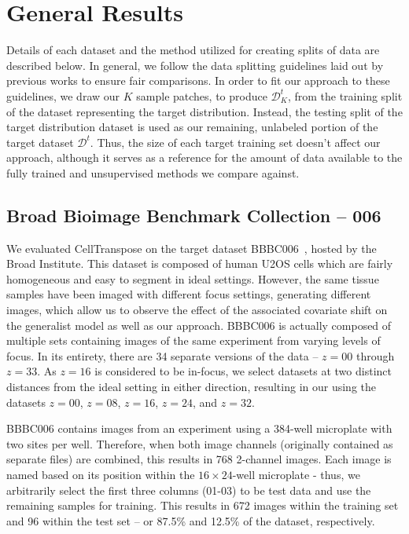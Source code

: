 
\section{General Results} \label{general_results}

Details of each dataset and the method utilized for creating splits of data are described below. In general, we follow the data splitting guidelines laid out by previous works to ensure fair comparisons. In order to fit our approach to these guidelines, we draw our $K$ sample patches, to produce $\mathcal{D}^t_K$, from the training split of the dataset representing the target distribution. Instead, the testing split of the target distribution dataset is used as our remaining, unlabeled portion of the target dataset $\mathcal{D}^t$. Thus, the size of each target training set doesn't affect our approach, although it serves as a reference for the amount of data available to the fully trained and unsupervised methods we compare against.

\subsection{Broad Bioimage Benchmark Collection -- 006}
We evaluated CellTranspose on the target dataset BBBC006~\cite{Ljosa2012-si}, hosted by the Broad Institute. This dataset is composed of human U2OS cells which are fairly homogeneous and easy to segment in ideal settings. However, the same tissue samples have been imaged with different focus settings, generating different images, which allow us to observe the effect of the associated covariate shift on the generalist model as well as our approach. BBBC006 is actually composed of multiple sets containing images of the same experiment from varying levels of focus. In its entirety, there are 34 separate versions of the data -- $z=00$ through $z=33$. As $z=16$ is considered to be in-focus, we select datasets at two distinct distances from the ideal setting in either direction, resulting in our using the datasets $z=00$, $z=08$, $z=16$, $z=24$, and $z=32$.

BBBC006 contains images from an experiment using a 384-well microplate with two sites per well. Therefore, when both image channels (originally contained as separate files) are combined, this results in 768 2-channel images. Each image is named based on its position within the $16 \times 24$-well microplate - thus, we arbitrarily select the first three columns (01-03) to be test data and use the remaining samples for training. This results in 672 images within the training set and 96 within the test set -- or 87.5\% and 12.5\% of the dataset, respectively.

